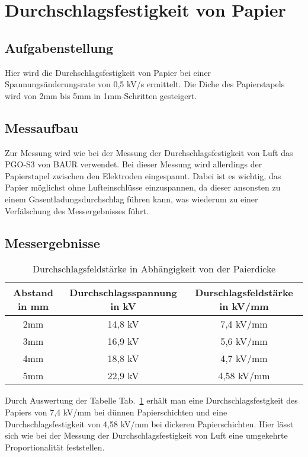 \documentclass[a4paper,twoside,12pt,DIV=13,BCOR=5mm,numbers=noenddot,cleardoublepage=empty]{scrbook}
\begin{document}
	\section{Durchschlagsfestigkeit von Papier}
	
		\subsection{Aufgabenstellung}
		Hier wird die Durchschlagsfestigkeit von Papier bei einer Spannungs\"anderungsrate von 0,5 kV/s ermittelt. 
		Die Diche des Papierstapels wird von 2mm bis 5mm in 1mm-Schritten gesteigert.
		\subsection{Messaufbau}
		Zur Messung wird wie bei der Messung der Durchschlagsfestigkeit von Luft das PGO-S3 von BAUR verwendet. 
		Bei dieser Messung wird allerdings der Papierstapel zwischen den Elektroden eingespannt.
		Dabei ist es wichtig, das Papier m\"oglichst ohne Lufteinschl\"usse einzuspannen, da dieser ansonsten zu einem Gasentladungsdurchschlag f\"uhren kann, was wiederum zu einer Verf\"alschung des Messergebnisses f\"uhrt.
		\subsection{Messergebnisse}
		\begin{table}
			\begin{center}
				\begin{tabular}{|c| |c| |c|}
					\hline
					Abstand in mm & Durchschlagsspannung in kV & Durschlagsfeldst\"arke in kV/mm \\
					\hline
					\hline
					2mm & 14,8 kV & 7,4 kV/mm \\
					\hline
					3mm & 16,9 kV & 5,6 kV/mm \\
					\hline
					4mm & 18,8 kV & 4,7 kV/mm \\
					\hline
					5mm & 22,9 kV & 4,58 kV/mm \\
					\hline				
				\end{tabular}
			\caption{Durchschlagsfeldst\"arke in Abh\"angigkeit von der Paierdicke}
			\label{tab:table2}
			\end{center}
		\end{table}
		Durch Auswertung der Tabelle Tab.~\ref{tab:table2} erh\"alt man eine Durchschlagsfestgkeit des Papiers von 7,4 kV/mm bei d\"unnen Papierschichten und eine Durchschlagsfestigkeit von 4,58 kV/mm bei dickeren Papierschichten.
		Hier l\"asst sich wie bei der Messung der Durchschlagsfestigkeit von Luft eine umgekehrte Proportionalit\"at feststellen. 
		
\end{document}
